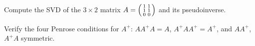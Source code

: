 \begin{notechapter}
\begin{exercise}\label{svd:exr:2}
Compute the SVD of the $3\times2$ matrix $A = \begin{psmallmatrix}1&1\\1&1\\0&0\end{psmallmatrix}$ and its
pseudoinverse.
\end{exercise}

\begin{exercise}\label{svd:exr:3}
Verify the four Penrose conditions for $A^+$: $AA^+A = A$, $A^+AA^+ = A^+$, and $AA^+$, $A^+A$
symmetric.
\end{exercise}
\end{notechapter}
